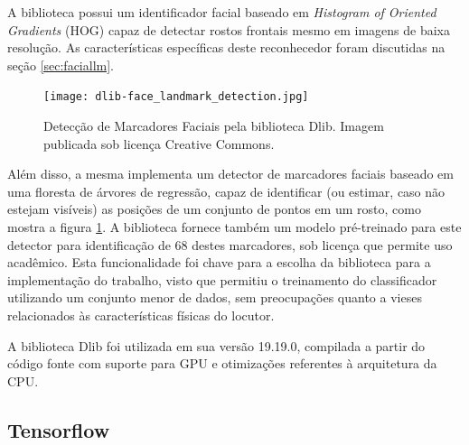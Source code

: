A biblioteca possui um identificador facial baseado em \textit{Histogram of Oriented Gradients} (HOG) capaz de detectar rostos frontais mesmo em imagens de baixa resolução.
As características específicas deste reconhecedor foram discutidas na seção \ref{sec:faciallm}.


\begin{figure}[ht]
    \centering
    \texttt{[image: dlib-face\_landmark\_detection.jpg]}    
    \caption{Detecção de Marcadores Faciais pela biblioteca Dlib. Imagem publicada sob licença Creative Commons\cite{mtheilerDeteccaoMarcadoresFaciais2019}. }
    \label{fig:dlib-landmarking}
\end{figure}

Além disso, a mesma implementa um detector de marcadores faciais baseado em uma floresta de árvores de regressão, capaz de identificar (ou estimar, caso não estejam visíveis) as posições de um conjunto de pontos em um rosto, como mostra a figura \ref{fig:dlib-landmarking}.
A biblioteca fornece também um modelo pré-treinado para este detector para identificação de 68 destes marcadores, sob licença que permite uso acadêmico.
Esta funcionalidade foi chave para a escolha da biblioteca para a implementação do trabalho, visto que permitiu o treinamento do classificador utilizando um conjunto menor de dados, sem preocupações quanto a vieses relacionados às características físicas do locutor.

A biblioteca Dlib foi utilizada em sua versão 19.19.0, compilada a partir do código fonte com suporte para GPU e otimizações referentes à arquitetura da CPU.

\subsection{Tensorflow}
\label{subsec:tf}

